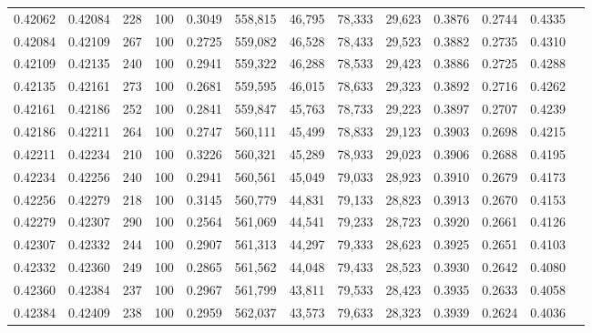 \begin{tabular}{rrrrrrrrrrrrr}
0.42062 & 0.42084 &   228 & 100 &                                     0.3049 & 558,815 &  46,795 &  78,333 &  29,623 & 0.3876 & 0.2744 & 0.4335 \\
0.42084 & 0.42109 &   267 & 100 &                                     0.2725 & 559,082 &  46,528 &  78,433 &  29,523 & 0.3882 & 0.2735 & 0.4310 \\
0.42109 & 0.42135 &   240 & 100 &                                     0.2941 & 559,322 &  46,288 &  78,533 &  29,423 & 0.3886 & 0.2725 & 0.4288 \\
0.42135 & 0.42161 &   273 & 100 &                                     0.2681 & 559,595 &  46,015 &  78,633 &  29,323 & 0.3892 & 0.2716 & 0.4262 \\
0.42161 & 0.42186 &   252 & 100 &                                     0.2841 & 559,847 &  45,763 &  78,733 &  29,223 & 0.3897 & 0.2707 & 0.4239 \\
0.42186 & 0.42211 &   264 & 100 &                                     0.2747 & 560,111 &  45,499 &  78,833 &  29,123 & 0.3903 & 0.2698 & 0.4215 \\
0.42211 & 0.42234 &   210 & 100 &                                     0.3226 & 560,321 &  45,289 &  78,933 &  29,023 & 0.3906 & 0.2688 & 0.4195 \\
0.42234 & 0.42256 &   240 & 100 &                                     0.2941 & 560,561 &  45,049 &  79,033 &  28,923 & 0.3910 & 0.2679 & 0.4173 \\
0.42256 & 0.42279 &   218 & 100 &                                     0.3145 & 560,779 &  44,831 &  79,133 &  28,823 & 0.3913 & 0.2670 & 0.4153 \\
0.42279 & 0.42307 &   290 & 100 &                                     0.2564 & 561,069 &  44,541 &  79,233 &  28,723 & 0.3920 & 0.2661 & 0.4126 \\
0.42307 & 0.42332 &   244 & 100 &                                     0.2907 & 561,313 &  44,297 &  79,333 &  28,623 & 0.3925 & 0.2651 & 0.4103 \\
0.42332 & 0.42360 &   249 & 100 &                                     0.2865 & 561,562 &  44,048 &  79,433 &  28,523 & 0.3930 & 0.2642 & 0.4080 \\
0.42360 & 0.42384 &   237 & 100 &                                     0.2967 & 561,799 &  43,811 &  79,533 &  28,423 & 0.3935 & 0.2633 & 0.4058 \\
0.42384 & 0.42409 &   238 & 100 &                                     0.2959 & 562,037 &  43,573 &  79,633 &  28,323 & 0.3939 & 0.2624 & 0.4036 \\

\end{tabular}

